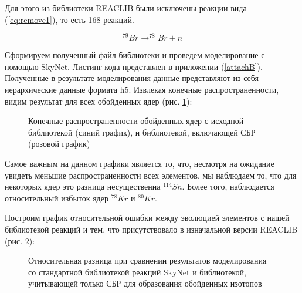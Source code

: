 \documentclass[14pt, a4paper]{article}
\numberwithin{figure}{section}
\numberwithin{equation}{section}
\begin{document}
Для этого из библиотеки REACLIB были исключены реакции вида (\ref{eq:remove1}), то есть 168 реакций.

\begin{equation}
\label{eq:remove1}
	^{79}Br \to ^{78}Br + n
\end{equation}

Сформируем полученный файл библиотеки и проведем моделирование с помощью SkyNet. Листинг кода представлен в приложении (\ref{attachB}). Полученные в результате моделирования данные представляют из себя иерархические данные формата h5. Извлекая конечные распространенности, видим результат для всех обойденных ядер (рис. \ref{ris:result}):

\begin{figure}
	\caption{Конечные распространенности обойденных ядер с исходной библиотекой (синий график), и библиотекой, включающей СБР (розовой график)}
	\label{ris:result}
\end{figure}

Самое важным на данном графики является то, что, несмотря на ожидание увидеть меньшие распространенности всех элементов, мы наблюдаем то, что для некоторых ядер это разница несущественна $^{114}Sn$. Более того, наблюдается относительный избыток ядер $^{78}Kr$ и $^{80}Kr$.

Построим график относительной ошибки между эволюцией элементов с нашей библиотекой реакций и тем, что присутствовало в изначальной версии REACLIB (рис. \ref{ris:result-err}):

\begin{figure}
	\caption{Относительная разница при сравнении результатов моделирования со стандартной библиотекой реакций SkyNet и библиотекой, учитывающей только СБР для образования обойденных изотопов}
	\label{ris:result-err}
\end{figure}
\end{document}
